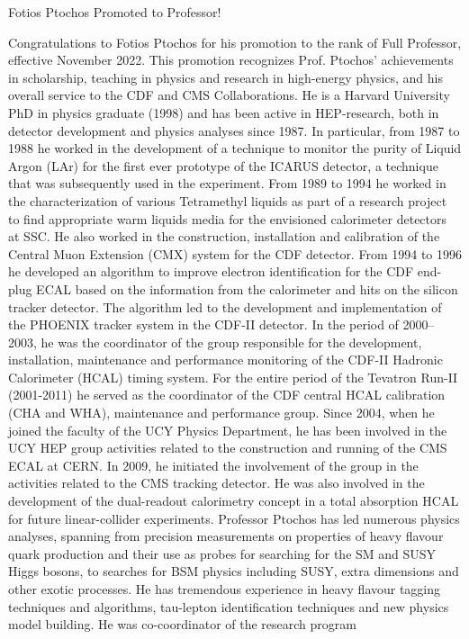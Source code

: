 \begin{headline}[enhanced, tikz={rotate=0}]{Fotios Ptochos Promoted to Professor!}
\begin{multicols}{2}
 Congratulations to Fotios Ptochos for his promotion to the rank of
 Full Professor, effective November 2022. This promotion recognizes
 Prof. Ptochos' achievements in scholarship, teaching in physics and research in
 high-energy physics, and his overall service to the CDF and CMS
 Collaborations. He is a Harvard University PhD in physics
 graduate (1998) and has been active in HEP-research, both in detector
development and physics analyses since 1987. In particular, from 1987
to 1988 he worked in the development of a technique to monitor the
purity of Liquid Argon (LAr) for the first ever prototype of the
ICARUS detector, a technique that was subsequently used in the
experiment. From 1989 to 1994 he worked in the characterization of
various Tetramethyl liquids as part of a research project to find
appropriate warm liquids media for the envisioned calorimeter
detectors at SSC. He also worked in the construction, installation and
calibration of the Central Muon Extension (CMX) system for the CDF
detector. From 1994 to 1996 he developed an algorithm to improve
electron identification for the CDF end-plug ECAL based on the
information from the calorimeter and hits on the silicon tracker
detector. The algorithm led to the development and implementation of
the PHOENIX tracker system in the CDF-II detector. 
In the period of 2000–2003, he was the coordinator of the group
responsible for the development, installation, maintenance and
performance monitoring of the CDF-II Hadronic Calorimeter (HCAL)
timing system. For the entire period of the Tevatron Run-II
(2001-2011) he served as the coordinator of the CDF central HCAL
calibration (CHA and WHA), maintenance and performance group. Since
2004, when he joined the faculty of the UCY Physics Department, he has
been involved in the UCY HEP group activities related to the
construction and running of the CMS ECAL at CERN. In 2009, he
initiated the involvement of the group in the activities related to
the CMS tracking detector. He was also involved in the development of
the dual-readout calorimetry concept in a total absorption HCAL for
future linear-collider experiments. 
Professor Ptochos has led numerous physics analyses, spanning
from precision measurements on properties of heavy flavour quark
production and their use as probes for searching for the SM and SUSY
Higgs bosons, to searches for BSM physics including SUSY, extra
dimensions and other exotic processes. He has tremendous experience in
heavy flavour tagging techniques and algorithms, tau-lepton
identification techniques and new physics model building. 
He was co-coordinator of the research program

\end{multicols}
\end{headline}
